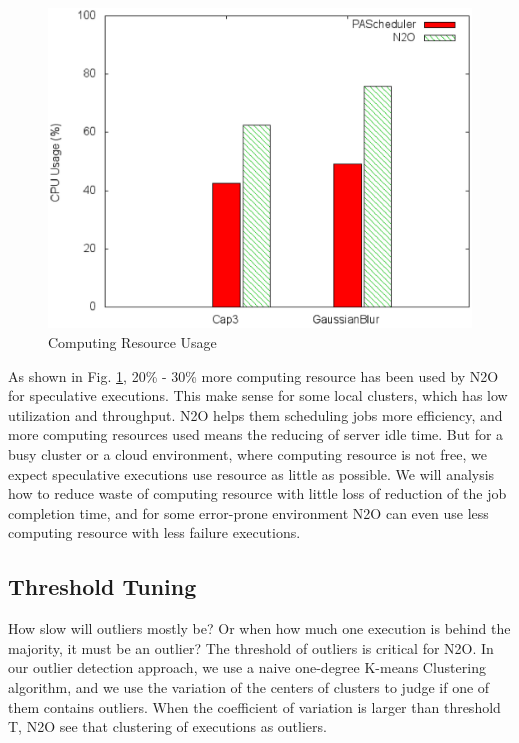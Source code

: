 \begin{figure}
\centering
\includegraphics[width=0.9\columnwidth]{figures/resource_usage.eps}
\caption{Computing Resource Usage}
\label{figure:resourceusage}
\end{figure}

As shown in Fig.  \ref{figure:resourceusage}, 20\% - 30\% more computing resource has been used by N2O for speculative executions. This make sense for some local clusters, which has low utilization and throughput. N2O helps them scheduling jobs more efficiency, and more computing resources used means the reducing of server idle time. But for a busy cluster or a cloud environment, where computing resource is not free, we expect speculative executions use resource as little as possible. We will analysis how to reduce waste of computing resource with little loss of reduction of the job completion time, and for some error-prone environment N2O can even use less computing resource with less failure executions.

\subsection{Threshold Tuning}

How slow will outliers mostly be? Or when how much one execution is behind the majority, it must be an outlier? The threshold of outliers is critical for N2O. In our outlier detection approach, we use a naive one-degree K-means Clustering algorithm, and we use the variation of the centers of clusters to judge if one of them contains outliers. When the coefficient of variation is larger than threshold T, N2O see that clustering of executions as outliers.

